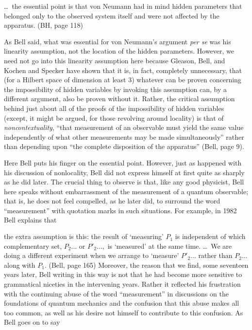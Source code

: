\bq \noindent\dots\  the essential point is that von Neumann had in mind hidden
parameters that belonged only to the observed system itself and were not
affected by the apparatus. (BH, page 118)
\eq

As Bell said, what was essential for von Neumann's argument {\it per se\/}
was his linearity assumption, not the location of the hidden parameters.
However, we need not go into this linearity assumption here because
Gleason, Bell, and Kochen and Specker have shown that it is, in fact,
completely unnecessary, that (for a Hilbert space of dimension at least 3)
whatever can be proven concerning the impossibility of hidden variables by
invoking this assumption can, by a different argument, also be proven
without it. Rather, the critical assumption behind just about all of the
proofs of the impossibility of hidden variables (except, it might be
argued, for those revolving around locality) is that of {\it
noncontextuality\/}, ``that measurement of an observable must yield the
same value independently of what other measurements may be made
simultaneously'' rather than depending upon ``the complete disposition of
the apparatus'' (Bell, page 9).

Here Bell puts his finger on the essential point. However, just as happened
with his discussion of nonlocality, Bell did not express himself at first
quite as sharply as he did later. The crucial thing to observe is that,
like any good physicist, Bell here speaks without embarrassment of the
measurement of a quantum observable; that is, he does not feel compelled,
as he later did, to surround the word ``measurement'' with quotation marks
in such situations. For example, in 1982 Bell explains that

\bq \noindent the extra assumption is this: the result of `measuring' $P_1$
is independent of which complementary set, $P_2\dots$ or  $P'_2\dots,$ is
`measured' at the same time. \dots\  We are doing a different experiment when
we arrange to  `measure' $P'_2\dots$ rather than $P_2\dots$  along with
$P_1$. (Bell, page 165)
\eq
Moreover, the reason that we find, some seventeen years later, Bell writing in
this way is not that he had become more sensitive to grammatical niceties
in the intervening years. Rather it reflected his frustration with the
continuing abuse of the word ``measurement'' in discussions on the
foundations of  quantum mechanics and the confusion that this abuse makes
all too common, as well as his desire not himself to contribute to this
confusion. As Bell goes on to say

